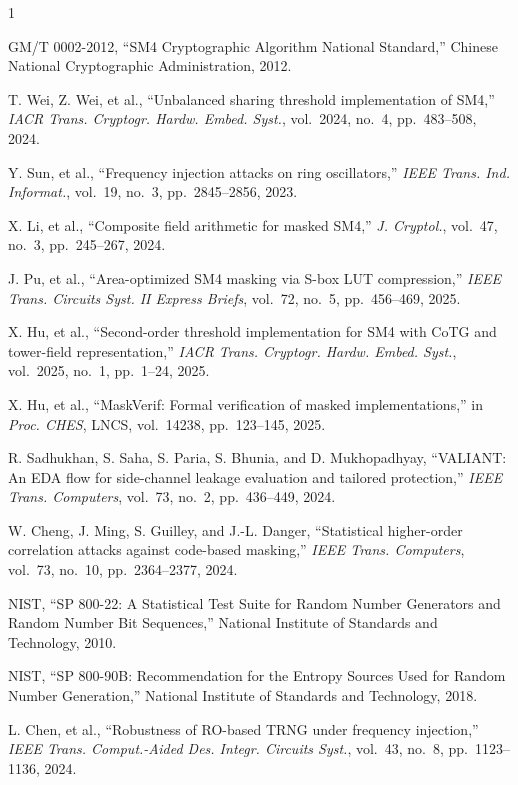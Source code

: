 \documentclass[journal]{IEEEtran}
\begin{document}
\begin{thebibliography}{1}\setlength{\itemsep}{0pt}\setlength{\parskip}{0pt}

GM/T 0002-2012, ``SM4 Cryptographic Algorithm National Standard,'' Chinese National Cryptographic Administration, 2012.

T. Wei, Z. Wei, et al., ``Unbalanced sharing threshold implementation of SM4,'' \textit{IACR Trans. Cryptogr. Hardw. Embed. Syst.}, vol.~2024, no.~4, pp.~483--508, 2024.

Y. Sun, et al., ``Frequency injection attacks on ring oscillators,'' \textit{IEEE Trans. Ind. Informat.}, vol.~19, no.~3, pp.~2845--2856, 2023.

X. Li, et al., ``Composite field arithmetic for masked SM4,'' \textit{J. Cryptol.}, vol.~47, no.~3, pp.~245--267, 2024.

J. Pu, et al., ``Area-optimized SM4 masking via S-box LUT compression,'' \textit{IEEE Trans. Circuits Syst. II Express Briefs}, vol.~72, no.~5, pp.~456--469, 2025.

X. Hu, et al., ``Second-order threshold implementation for SM4 with CoTG and tower-field representation,'' \textit{IACR Trans. Cryptogr. Hardw. Embed. Syst.}, vol.~2025, no.~1, pp.~1--24, 2025.

X. Hu, et al., ``MaskVerif: Formal verification of masked implementations,'' in \textit{Proc. CHES}, LNCS, vol.~14238, pp.~123--145, 2025.

R. Sadhukhan, S. Saha, S. Paria, S. Bhunia, and D. Mukhopadhyay, ``VALIANT: An EDA flow for side-channel leakage evaluation and tailored protection,'' \textit{IEEE Trans. Computers}, vol.~73, no.~2, pp.~436--449, 2024.

W. Cheng, J. Ming, S. Guilley, and J.-L. Danger, ``Statistical higher-order correlation attacks against code-based masking,'' \textit{IEEE Trans. Computers}, vol.~73, no.~10, pp.~2364--2377, 2024.

NIST, ``SP 800-22: A Statistical Test Suite for Random Number Generators and Random Number Bit Sequences,'' National Institute of Standards and Technology, 2010.

NIST, ``SP 800-90B: Recommendation for the Entropy Sources Used for Random Number Generation,'' National Institute of Standards and Technology, 2018.

L. Chen, et al., ``Robustness of RO-based TRNG under frequency injection,'' \textit{IEEE Trans. Comput.-Aided Des. Integr. Circuits Syst.}, vol.~43, no.~8, pp.~1123--1136, 2024.

\end{thebibliography}
\end{document}
